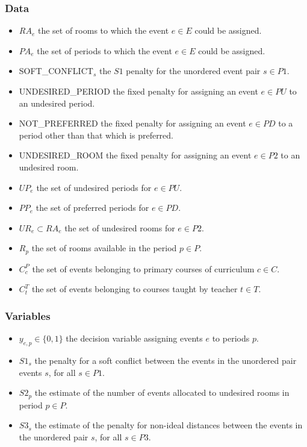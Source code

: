 \documentclass{article}
\theoremstyle{plain}
\numberwithin{theorem}{section}
\numberwithin{example}{section}
\theoremstyle{definition}
\begin{document}
\subsubsection*{Data}
\begin{itemize}
    \item $RA_e$ the set of rooms to which the event $e \in E$ could be
        assigned.
    \item $PA_e$ the set of periods to which the event $e \in E$ could be
        assigned.
    \item SOFT\_CONFLICT$_s$ the $S1$ penalty for the unordered event pair $s \in
        P1$.
    \item UNDESIRED\_PERIOD the fixed penalty for assigning an event $e \in PU$
        to an undesired period.
    \item NOT\_PREFERRED the fixed penalty for assigning an event $e \in PD$ to
        a period other than that which is preferred.
    \item UNDESIRED\_ROOM the fixed penalty for assigning an event $e \in P2$ to
        an undesired room.
    \item $UP_e$ the set of undesired periods for $e \in PU$.
    \item $PP_e$ the set of preferred periods for $e \in PD$.
    \item $UR_e \subset RA_e$ the set of undesired rooms for $e \in P2$.
    \item $R_p$ the set of rooms available in the period $p \in P$.
    \item $C^P_c$ the set of events belonging to primary courses of curriculum
        $c \in C$.
    \item $C^T_t$ the set of events belonging to courses taught by teacher $t
        \in T$.
\end{itemize}

\subsubsection*{Variables}
\begin{itemize}
    \item $y_{e, p} \in \{0,1\}$ the decision variable assigning events $e$ to
        periods $p$.
    \item $S1_s$ the penalty for a soft conflict between the events in the
        unordered pair events $s$, for all $s \in P1$.
    \item $S2_p$ the estimate of the number of events allocated to undesired
        rooms in period $p \in P$.
    \item $S3_s$ the estimate of the penalty for non-ideal distances between the
        events in the unordered pair $s$, for all $s \in P3$.
\end{itemize}
\end{document}
